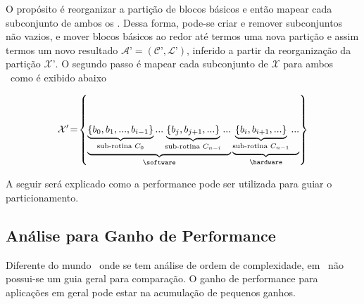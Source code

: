           \makeatletter
          \def\@eqnnum{{\normalsize \normalcolor (\theequation)}}
           \makeatother

         O propósito é reorganizar a partição de blocos básicos e então mapear cada subconjunto de ambos os \hs.
         Dessa forma, pode-se criar e remover subconjuntos não vazios, e mover blocos básicos ao redor até termos uma nova partição e assim termos um novo resultado $ \mathcal{A}’ = (\mathcal{C}’, \mathcal{L}’) $, inferido a partir da reorganização da partição $ \mathcal{X}’ $.
         O segundo passo é mapear cada subconjunto de $ \mathcal{X} $ para ambos \hs\ como é exibido abaixo

         { \small
         \begin{equation}
            \mathcal{X}'\!=\!\left \{
            \underbrace{
               \underbrace{
                  \left \{ b_0, b_1, ..., b_{i-1} \right \}
               }_{\textnormal{sub-rotina }C_0}
               ...
               \underbrace{
                  \left \{ b_j, b_{j+1}, ... \right \}
               }_{\textnormal{sub-rotina }C_{n-i}}
               ...
            }_{\textnormal{\software}}
            \underbrace{
               \underbrace{
                  \left \{ b_i, b_{i+1}, ... \right \}
               }_{\textnormal{sub-rotina }C_{n-1}}
               ...
            }_{\textnormal{\hardware}}
            \right \} \label{eq:part_final}
         \end{equation}
         }

         A seguir será explicado como a performance pode ser utilizada para guiar o particionamento.


   \subsection{Análise para Ganho de Performance} \label{sec:ganho_performance}
      Diferente do mundo \software\ onde se tem análise de ordem de complexidade, em \hardware\ não possui-se um guia geral para comparação.
      O ganho de performance para aplicações em geral pode estar na acumulação de pequenos ganhos.%

